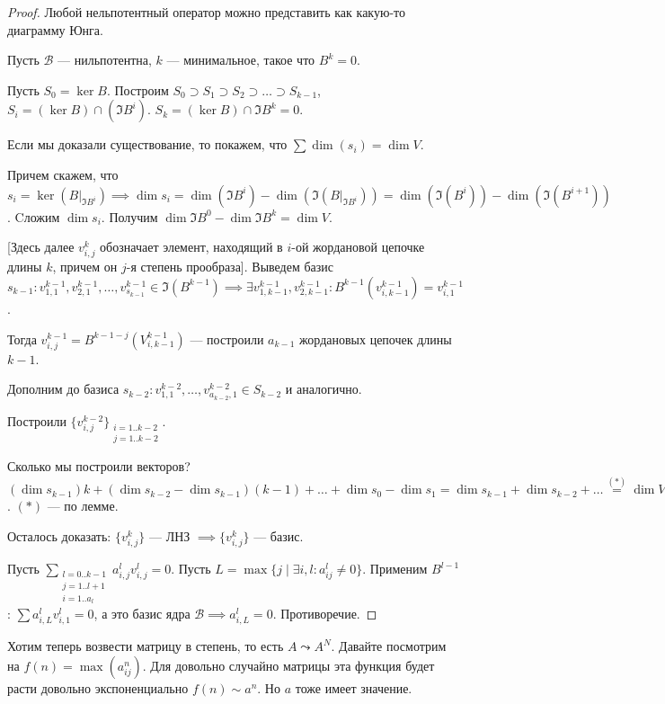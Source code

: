 \begin{proof}
    Любой нельпотентный оператор можно представить как какую-то диаграмму Юнга. 

    Пусть $\mathcal{B}$ --- нильпотентна,  $k$ --- минимальное, такое что  $B^k = 0$. 

    Пусть  $S_0 = \ker B$. Построим  $S_0 \supset S_1 \supset S_2 \supset \ldots \supset S_{k-1}$, $S_i = (\ker B) \cap (\Im B^i)$. $S_k = (\ker B) \cap \Im B^k = 0$.
    
    Если мы доказали существование, то покажем, что  $\sum \dim (s_i) = \dim V$.

    Причем скажем, что $s_i = \ker(B \Big|_{\Im B^i}) \implies \dim s_i = \dim (\Im B^i) - \dim(\Im(B\Big|_{\Im B^i})) = \dim (\Im (B^i)) - \dim(\Im(B^{i+1}))$. Cложим  $\dim s_i$. Получим  $\dim \Im B^0 - \dim \Im B^k = \dim V$. 

    [Здесь далее $v_{i, j}^k$ обозначает элемент, находящий в $i$-ой жордановой цепочке длины  $k$, причем он  $j$-я степень прообраза]. Выведем базис $s_{k-1}\!: v_{1,1}^{k-1}, v_{2, 1}^{k-1}, \ldots, v_{s_{k-1}}^{k-1} \in \Im(B^{k-1}) \implies \exists v_{1, k-1}^{k-1}, v_{2, k - 1}^{k-1}\!: B^{k-1} (v_{i, k - 1}^{k-1}) = v_{i, 1}^{k-1}$.

    Тогда $v_{i,j}^{k-1} = B^{k-1-j}(V_{i, k-1}^{k-1})$ --- построили  $a_{k-1}$ жордановых цепочек длины  $k-1$. 

    Дополним до базиса $s_{k-2}\!: v_{1,1}^{k-2}, \ldots, v_{a_{k-2}, 1}^{k-2} \in S_{k-2}$ и аналогично.

    Построили $\{v_{i, j}^{k-2}\}_{\substack{i=1..k-2\\j=1..k-2}}$. 

    Сколько мы построили векторов? $(\dim s_{k-1}) k + (\dim s_{k-2} - \dim s_{k-1})(k-1) + \ldots + \dim s_0 - \dim s_1 = \dim s_{k-1} + \dim s_{k-2} + \ldots \overset{(*)}{=} \dim V$. $(*)$ --- по лемме.

    Осталось доказать: $\{v_{i, j}^k\}$ --- ЛНЗ  $\implies \{v_{i, j}^k\}$ --- базис.

    Пусть  $\sum_{\substack{l=0..k-1\\j=1..l+1\\i=1..a_l}} a_{i, j}^l v_{i, j}^l = 0$. Пусть  $L = \max\{j \mid \exists i, l\!: a_{ij}^l \neq 0\}$. Применим  $B^{l-1}$:  $\sum a_{i, L}^l v_{i, 1}^l = 0$, а это базис ядра  $\mathcal{B} \implies a_{i, L}^l = 0$. Противоречие. 
\end{proof}

Хотим теперь возвести матрицу в степень, то есть $A \leadsto A^N$. Давайте посмотрим на  $f(n) = \max(a_{ij}^n)$. Для довольно случайно матрицы эта функция будет расти довольно экспоненциально $f(n) \sim a^n$. Но $a$ тоже имеет значение.

